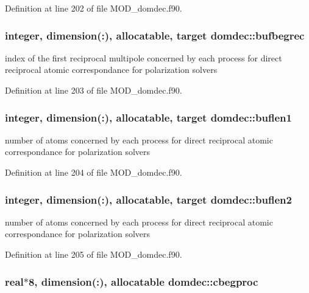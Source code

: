 Definition at line 202 of file M\-O\-D\-\_\-domdec.\-f90.

\hypertarget{classdomdec_af1a239b39d8aba8af456077bf0fe2eb9}{
\subsubsection[{bufbegrec}]{\setlength{\rightskip}{0pt plus 5cm}integer, dimension(\-:), allocatable, target domdec\-::bufbegrec}}\label{classdomdec_af1a239b39d8aba8af456077bf0fe2eb9}


index of the first reciprocal multipole concerned by each process for direct reciprocal atomic correspondance for polarization solvers 



Definition at line 203 of file M\-O\-D\-\_\-domdec.\-f90.

\hypertarget{classdomdec_a8ad5403cf1da77b23f0dc43e220a8f1d}{
\subsubsection[{buflen1}]{\setlength{\rightskip}{0pt plus 5cm}integer, dimension(\-:), allocatable, target domdec\-::buflen1}}\label{classdomdec_a8ad5403cf1da77b23f0dc43e220a8f1d}


number of atoms concerned by each process for direct reciprocal atomic correspondance for polarization solvers 



Definition at line 204 of file M\-O\-D\-\_\-domdec.\-f90.

\hypertarget{classdomdec_adde65e323deb64b0d4531cf1d930b4a9}{
\subsubsection[{buflen2}]{\setlength{\rightskip}{0pt plus 5cm}integer, dimension(\-:), allocatable, target domdec\-::buflen2}}\label{classdomdec_adde65e323deb64b0d4531cf1d930b4a9}


number of atoms concerned by each process for direct reciprocal atomic correspondance for polarization solvers 



Definition at line 205 of file M\-O\-D\-\_\-domdec.\-f90.

\hypertarget{classdomdec_a2e88f8020b2ae7a7a37fded2d39153a3}{
\subsubsection[{cbegproc}]{\setlength{\rightskip}{0pt plus 5cm}real$\ast$8, dimension(\-:), allocatable domdec\-::cbegproc}}\label{classdomdec_a2e88f8020b2ae7a7a37fded2d39153a3}



